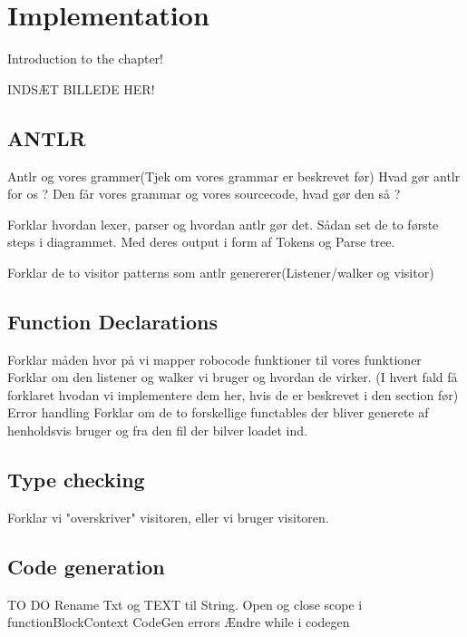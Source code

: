 \chapter{Implementation}
Introduction to the chapter!

INDSÆT BILLEDE HER!

\section{ANTLR}
Antlr og vores grammer(Tjek om vores grammar er beskrevet før)
Hvad gør antlr for os ?
Den får vores grammar og vores sourcecode, hvad gør den så ?


Forklar hvordan lexer, parser og hvordan antlr gør det. Sådan set de to første steps i diagrammet. Med deres output i form af Tokens og Parse tree.

Forklar de to visitor patterns som antlr genererer(Listener/walker og visitor)
\section{Function Declarations}
Forklar måden hvor på vi mapper robocode funktioner til vores funktioner
Forklar om den listener og walker vi bruger og hvordan de virker. (I hvert fald  få forklaret hvodan vi implementere dem her, hvis de er beskrevet  i den section før)
Error handling
Forklar om de to forskellige functables der bliver generete af henholdsvis bruger og fra den fil der bilver loadet ind. 



\section{Type checking}
Forklar vi "overskriver" visitoren, eller vi bruger visitoren. 


\section{Code generation}




TO DO
Rename Txt og TEXT til String.
Open og close scope i functionBlockContext
CodeGen errors
Ændre while i codegen
